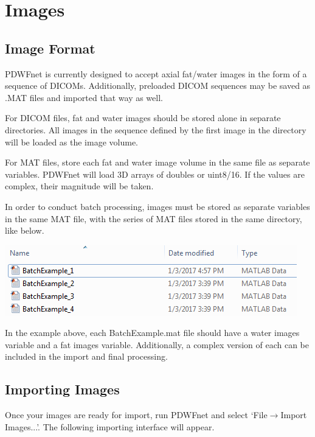 \documentclass[twoside,a4paper]{refart}
\begin{document}

\section{Images}

\subsection{Image Format}

PDWFnet is currently designed to accept axial fat/water images in the form of a sequence of DICOMs. Additionally, preloaded DICOM sequences may be saved as .MAT files and imported that way as well.

For DICOM files, fat and water images should be stored alone in separate directories. All images in the sequence defined by the first image in the directory will be loaded as the image volume.

For MAT files, store each fat and water image volume in the same file as separate variables. PDWFnet will load 3D arrays of doubles or uint8/16. If the values are complex, their magnitude will be taken.

In order to conduct batch processing, images must be stored as separate variables in the same MAT file, with the series of MAT files stored in the same directory, like below.

\includegraphics[width=.7\textwidth]{BatchMAT_cap.PNG}

In the example above, each BatchExample.mat file should have a water images variable and a fat images variable. Additionally, a complex version of each can be included in the import and final processing.

\subsection{Importing Images}

Once your images are ready for import, run PDWFnet and select `File$\rightarrow$Import Images...'. The following importing interface will appear.
\end{document}
